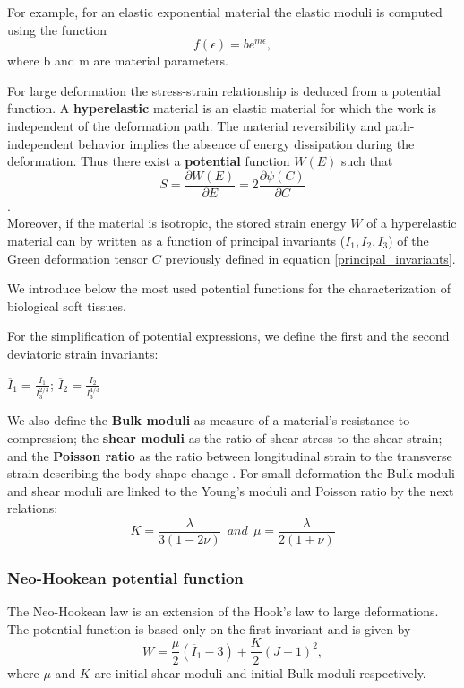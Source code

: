 For example, for an elastic exponential material \citep{azar_methods_2002} the elastic moduli is computed using the function 
\begin{equation}
f(\epsilon) = b e^{m \epsilon},
\end{equation} 
where b and m are material parameters.
 
For large deformation the stress-strain relationship is deduced from a potential function. A \textbf{hyperelastic} material is an elastic material for which the work is independent of the deformation path. The material reversibility and path-independent behavior implies the absence of energy dissipation during the deformation. Thus there exist a \textbf{potential} function $W(E)$ such that $$S = \frac{\partial W(E)}{\partial E}= 2\frac{\partial \psi (C)}{\partial C}$$.\\
Moreover, if the material is isotropic, the stored strain energy $W$ of a hyperelastic material can by written as a function of principal invariants ($I_1, I_2, I_3$) of the Green deformation tensor $C$ previously defined in equation \ref{principal_invariants}.

We introduce below the most used potential functions for the characterization of biological soft tissues.
 
For the simplification of potential expressions, we define the first and the second deviatoric strain invariants:
\begin{center}
$\overline{I}_1=\frac{I_1}{I_3^{2/3}} $;  $\overline{I}_2=\frac{I_2}{I_3^{4/3}}$
\end{center}

We also define the \textbf{ Bulk moduli}  as measure of a material's resistance to compression; the \textbf{shear moduli} as the ratio of shear stress to the shear strain; and the \textbf{Poisson ratio}  as the ratio between longitudinal strain to the transverse strain describing the body shape change . For small deformation the Bulk moduli and shear moduli are linked to the Young's moduli and Poisson ratio by the next relations:
 \begin{equation} 
  K = \frac{\lambda}{3(1-2\nu)} \ \ and \ \ \mu = \frac{\lambda}{2(1+\nu)}
\end{equation}
  
\subsubsection*{Neo-Hookean potential function}
The Neo-Hookean \citep{treloar_elasticity_1943} law is an extension of the Hook's law to large deformations. The potential function is based only on the first invariant and is given by 
\begin{equation}
\label{eq:Neo-Hookmodel}
W =\frac{\mu}{2} (\overline{I}_1-3) + \frac{K}{2}(J-1)^2,
\end{equation}
where $\mu$ and $K$ are initial shear moduli and initial Bulk moduli respectively. 
